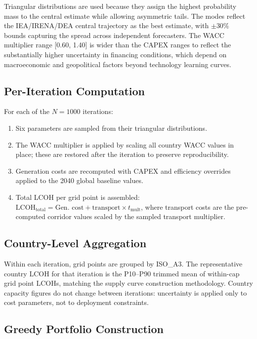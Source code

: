 Triangular distributions are used because they assign the highest probability mass to the central estimate while allowing asymmetric tails. The modes reflect the IEA/IRENA/DEA central trajectory as the best estimate, with $\pm$30\% bounds capturing the spread across independent forecasters. The WACC multiplier range [0.60, 1.40] is wider than the CAPEX ranges to reflect the substantially higher uncertainty in financing conditions, which depend on macroeconomic and geopolitical factors beyond technology learning curves.

\subsection{Per-Iteration Computation}

For each of the $N = 1000$ iterations:
\begin{enumerate}
    \item Six parameters are sampled from their triangular distributions.
    \item The WACC multiplier is applied by scaling all country WACC values in place; these are restored after the iteration to preserve reproducibility.
    \item Generation costs are recomputed with CAPEX and efficiency overrides applied to the 2040 global baseline values.
    \item Total LCOH per grid point is assembled: $\text{LCOH}_{\text{total}} = \text{Gen.\ cost} + \text{transport} \times t_{\text{mult}}$, where transport costs are the pre-computed corridor values scaled by the sampled transport multiplier.
\end{enumerate}

\subsection{Country-Level Aggregation}

Within each iteration, grid points are grouped by ISO\_A3. The representative country LCOH for that iteration is the P10--P90 trimmed mean of within-cap grid point LCOHs, matching the supply curve construction methodology. Country capacity figures do not change between iterations: uncertainty is applied only to cost parameters, not to deployment constraints.

\subsection{Greedy Portfolio Construction}

